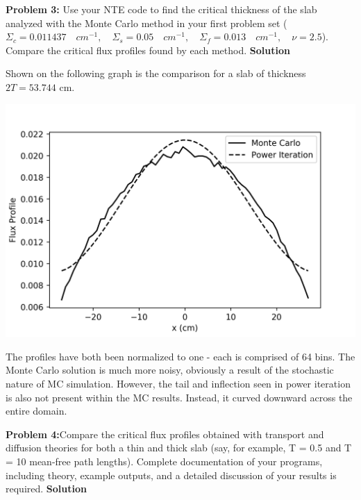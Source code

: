 \documentclass{amsart}
\theoremstyle{definition}
\begin{document}
\newpage
\textbf{Problem 3:} Use your NTE code to find the critical thickness of the slab analyzed with the Monte Carlo method in your first problem set ($\Sigma_c = 0.011437\quad cm^{-1}, \quad \Sigma_s = 0.05\quad cm^{-1}, \quad \Sigma_f = 0.013\quad cm^{-1}, \quad \nu=2.5$).
Compare the critical flux profiles found by each method.
\bigbreak
\textbf{Solution}

Shown on the following graph is the comparison for a slab of thickness $2T = 53.744$ cm.

\begin{center}
\includegraphics[totalheight=.40\textheight]{comparison.png}
\end{center}

The profiles have both been normalized to one - each is comprised of 64 bins.
The Monte Carlo solution is much more noisy, obviously a result of the stochastic nature of MC simulation.
However, the tail and inflection seen in power iteration is also not present within the MC results.
Instead, it curved downward across the entire domain.

\newpage
\textbf{Problem 4:}Compare the critical flux profiles obtained with transport and diffusion theories for both a thin and thick slab (say, for example, T = 0.5 and T = 10 mean-free path lengths).
\bigbreak
Complete documentation of your programs, including theory, example outputs, and a detailed discussion of your results is required.
\bigbreak
\textbf{Solution}
\end{document}
